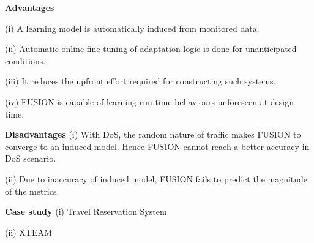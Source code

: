 \begin{compactitem}
\item[\textbf{Advantages}] 

(i) A learning model is automatically induced from monitored data.

(ii) Automatic online fine-tuning of adaptation logic is done for unanticipated conditions.

(iii) It reduces the upfront effort required for constructing such systems.

(iv) FUSION is capable of learning run-time behaviours unforeseen at design-time.\item[\textbf{Disadvantages}] 
(i) With DoS, the random nature of traffic makes FUSION to converge to an induced model. Hence FUSION cannot reach a better accuracy in DoS scenario. 

(ii) Due to inaccuracy of induced model, FUSION fails to predict the magnitude of the metrics.


\item[\textbf{Case study}] 
(i) Travel Reservation System

(ii) XTEAM

\end{compactitem}
